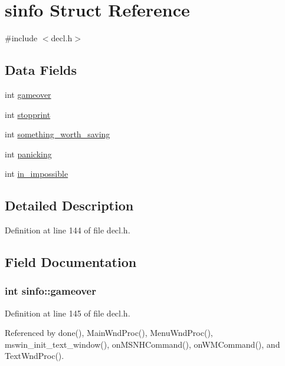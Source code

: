 \hypertarget{structsinfo}{\section{sinfo Struct Reference}
\label{structsinfo}
}


{\ttfamily \#include $<$decl.\+h$>$}

\subsection*{Data Fields}
\begin{DoxyCompactItemize}
\item 
int \hyperlink{structsinfo_ac1f9d8fcec6871fb805fe566ac8a8823}{gameover}
\item 
int \hyperlink{structsinfo_a722956debc5ac939d455ba63e60fd963}{stopprint}
\item 
int \hyperlink{structsinfo_ae213176cfedea7945c371048e57e2931}{something\+\_\+worth\+\_\+saving}
\item 
int \hyperlink{structsinfo_abf3b0c7bbd74f57595e53ab0eadd30e9}{panicking}
\item 
int \hyperlink{structsinfo_ab3434c44155e413a2e3c2a35d3397bdc}{in\+\_\+impossible}
\end{DoxyCompactItemize}


\subsection{Detailed Description}


Definition at line 144 of file decl.\+h.



\subsection{Field Documentation}
\hypertarget{structsinfo_ac1f9d8fcec6871fb805fe566ac8a8823}{
\subsubsection[{gameover}]{\setlength{\rightskip}{0pt plus 5cm}int sinfo\+::gameover}}\label{structsinfo_ac1f9d8fcec6871fb805fe566ac8a8823}


Definition at line 145 of file decl.\+h.



Referenced by done(), Main\+Wnd\+Proc(), Menu\+Wnd\+Proc(), mswin\+\_\+init\+\_\+text\+\_\+window(), on\+M\+S\+N\+H\+Command(), on\+W\+M\+Command(), and Text\+Wnd\+Proc().

